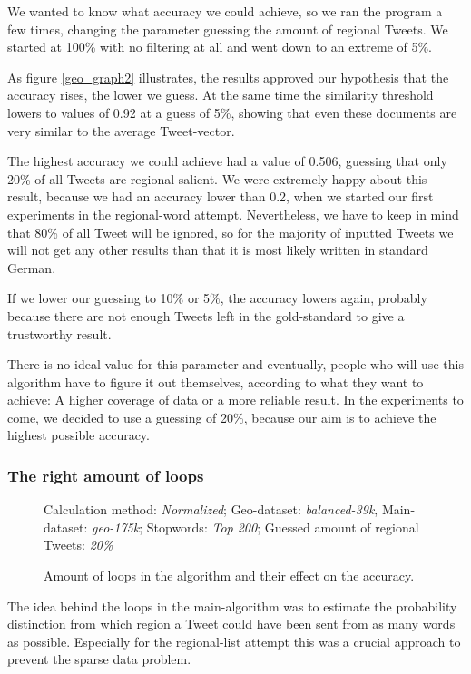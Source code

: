 \documentclass[../Main.tex]{subfiles}
\begin{document}
We wanted to know what accuracy we could achieve, so we ran the program a few times, changing the parameter guessing the amount of regional Tweets. We started at 100\% with no filtering at all and went down to an extreme of 5\%.

As figure \ref{geo_graph2} illustrates, the results approved our hypothesis that the accuracy rises, the lower we guess. At the same time the similarity threshold lowers to values of 0.92 at a guess of 5\%, showing that even these documents are very similar to the average Tweet-vector.

The highest accuracy we could achieve had a value of 0.506, guessing that only 20\% of all Tweets are regional salient. We were extremely happy about this result, because we had an accuracy lower than 0.2, when we started our first experiments in the regional-word attempt. Nevertheless, we have to keep in mind that 80\% of all Tweet will be ignored, so for the majority of inputted Tweets we will not get any other results than that it is most likely written in standard German.

If we lower our guessing to 10\% or 5\%, the accuracy lowers again, probably because there are not enough Tweets left in the gold-standard to give a trustworthy result.

There is no ideal value for this parameter and eventually, people who will use this algorithm have to figure it out themselves, according to what they want to achieve: A higher coverage of data or a more reliable result. In the experiments to come, we decided to use a guessing of 20\%, because our aim is to achieve the highest possible accuracy.

\subsubsection{The right amount of loops}
\begin{figure}

Calculation method: \textit{Normalized}; Geo-dataset: \textit{balanced-39k}, Main-dataset: \textit{geo-175k}; Stopwords: \textit{Top 200}; Guessed amount of regional Tweets: \textit{20\%}
  \caption{Amount of loops in the algorithm and their effect on the accuracy.}
  \label{geo_graph3}
\end{figure}
The idea behind the loops in the main-algorithm was to estimate the probability distinction from which region a Tweet could have been sent from as many words as possible. Especially for the regional-list attempt this was a crucial approach to prevent the sparse data problem.
\end{document}

